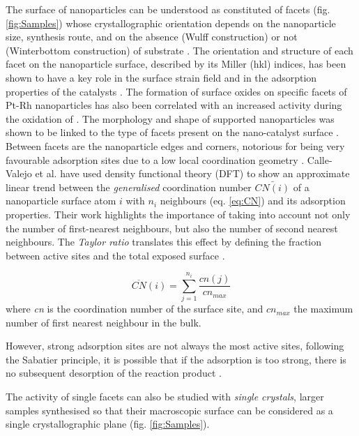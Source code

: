 The surface of nanoparticles can be understood as constituted of facets (fig. \ref{fig:Samples}) whose crystallographic orientation depends on the nanoparticle size, synthesis route, and on the absence (Wulff construction) or not (Winterbottom construction) of substrate \parencite{Wulff1901, Winterbottom1967, Boukouvala2021}.
The orientation and structure of each facet on the nanoparticle surface, described by its Miller (hkl) indices, has been shown to have a key role in the surface strain field and in the adsorption properties of the catalysts \parencite{Zhou2012, Wu2017, Altantzis2019, Wu2021}.
The formation of surface oxides on specific facets of Pt-Rh nanoparticles has also been correlated with an increased activity during the oxidation of  \parencite{Hejral2018}.
The morphology and shape of supported nanoparticles was shown to be linked to the type of facets present on the nano-catalyst surface \parencite{Ndolomingo2020}.
Between facets are the nanoparticle edges and corners, notorious for being very favourable adsorption sites due to a low local coordination geometry \parencite{Huang2008, Jiang2009}.
Calle-Valejo et al. \parencite*{CalleVallejo2014, CalleVallejo2015, CalleVallejo2018, CalleVallejo2023} have used density functional theory (DFT) to show an approximate linear trend between the \textit{generalised} coordination number $\bar{CN(i)}$ of a nanoparticle surface atom $i$ with $n_i$ neighbours (eq. \ref{eq:CN}) and its adsorption properties.
Their work highlights the importance of taking into account not only the number of first-nearest neighbours, but also the number of second nearest neighbours.
The \textit{Taylor ratio} translates this effect by defining the fraction between active sites and the total exposed surface \parencite{Taylor1925}.

\begin{equation}
    \overline{CN}(i) = \sum_{j=1}^{n_i} \frac{cn(j)}{cn_{max}}
    \label{eq:CN}
\end{equation}
where \textit{cn} is the coordination number of the surface site, and $cn_{max}$ the maximum number of first nearest neighbour in the bulk.

However, strong adsorption sites are not always the most active sites, following the Sabatier principle, it is possible that if the adsorption is too strong, there is no subsequent desorption of the reaction product \parencite{Nilsson2005, Jiang2009}.

The activity of single facets can also be studied with \textit{single crystals}, larger samples synthesised so that their macroscopic surface can be considered as a single crystallographic plane (fig. \ref{fig:Samples}).

